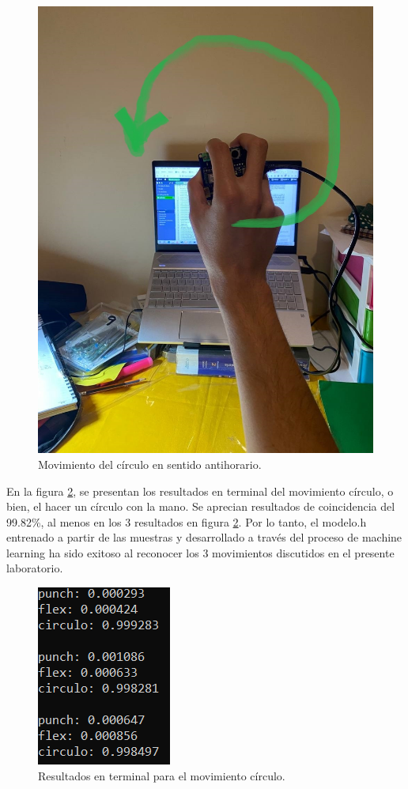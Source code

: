     \begin{figure}[H]
        \centering
        \includegraphics[width=0.5\linewidth]{pics/circulo.jpg}
        \caption{Movimiento del círculo en sentido antihorario.}
        \label{circulo1}
    \end{figure}

En la figura \ref{circulo2}, se presentan los resultados en terminal del movimiento círculo, o bien, el hacer un círculo con la mano. Se aprecian resultados de coincidencia del 99.82\%, al menos en los 3 resultados en figura \ref{circulo2}. Por lo tanto, el modelo.h entrenado a partir de las muestras y desarrollado a través del proceso de machine learning ha sido exitoso al reconocer los 3 movimientos discutidos en el presente laboratorio.

    \begin{figure}[H]
        \centering
        \includegraphics[width=0.3\linewidth]{pics/circulo2.png}
        \caption{Resultados en terminal para el movimiento círculo.}
        \label{circulo2}
    \end{figure}